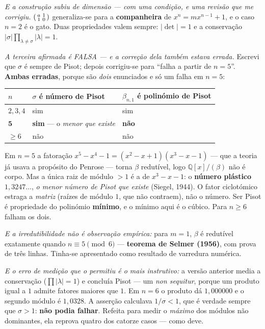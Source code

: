 \documentclass[11pt]{article}
\newcommand{\Q}{\mathbb Q}
\theoremstyle{plain}
\theoremstyle{remark}
\providecommand{\Mat}[1]{\begin{psmallmatrix}#1&1\\1&0\end{psmallmatrix}}
\begin{document}
\begin{itemize}
\emph{E a construção subiu de dimensão --- com uma condição, e uma revisão que me corrigiu.}
$\Mat{a}$ generaliza-se para a \textbf{companheira} de $x^n = m x^{n-1} + 1$, e o caso $n=2$ é o
gato. Duas propriedades valem sempre: $|\det| = 1$ e a conservação
$|\sigma|\prod_{\lambda\neq\sigma}|\lambda| = 1$.

\emph{A terceira afirmada é FALSA --- e a correção dela também estava errada.} Escrevi que
$\sigma$ é sempre de Pisot; depois corrigiu-se para ``falha a partir de $n=5$''. \textbf{Ambas erradas},
porque são \emph{dois} enunciados e só um falha em $n=5$:

\begin{center}\small
\begin{tabular}{lll}
\hline
$n$ & $\sigma$ é número de Pisot & $\beta_{n,1}$ é polinómio de Pisot \\ \hline
$2,3,4$ & sim & sim \\
$\mathbf 5$ & \textbf{sim} --- o \emph{menor que existe} & \textbf{não} \\
$\geq6$ & não & não \\
\hline
\end{tabular}
\end{center}

Em $n=5$ a fatoração $x^5-x^4-1 = (x^2-x+1)(x^3-x-1)$ --- que a teoria já usava a propósito do
Penrose --- torna $\beta$ redutível, logo $\Q[x]/(\beta)$ não é corpo. Mas a única raiz de módulo
$>1$ é a de $x^3-x-1$: o \textbf{número plástico} $1{,}3247\ldots$, \emph{o menor número de Pisot
que existe} (Siegel, 1944). O fator ciclotómico estraga a \emph{matriz} (raízes de módulo $1$, que
não contraem), não o número. Ser Pisot é propriedade do polinómio \textbf{mínimo}, e o mínimo aqui é
o cúbico. Para $n\geq6$ falham os dois.

\emph{E a irredutibilidade não é observação empírica:} para $m=1$, $\beta$ é redutível exatamente
quando $n\equiv5\pmod6$ --- \textbf{teorema de Selmer (1956)}, com prova de três linhas. Tinha-se
apresentado como resultado de varredura numérica.

\emph{E o erro de medição que o permitiu é o mais instrutivo:} a versão anterior media a
conservação ($\prod|\lambda| = 1$) e concluía Pisot --- um \emph{non sequitur}, porque um produto
igual a $1$ admite fatores maiores que $1$. Em $n=6$ o produto dá $1{,}000000$ e o segundo módulo é
$1{,}0328$. A asserção calculava $1/\sigma < 1$, que é verdade sempre que $\sigma>1$: \textbf{não
podia falhar}. Refeita para medir o \emph{máximo} dos módulos não dominantes, ela reprova quatro dos
catorze casos --- como deve.


\end{itemize}
\end{document}
